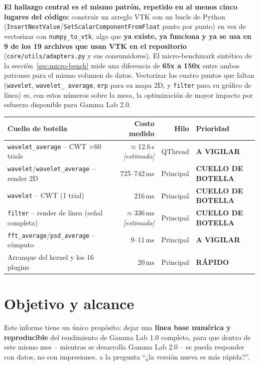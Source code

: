 \documentclass[11pt,a4paper]{article}
\newcommand{\okmark}{\textcolor{ok}{\textbf{RÁPIDO}}}
\newcommand{\warnmark}{\textcolor{advertencia}{\textbf{A VIGILAR}}}
\newcommand{\critmark}{\textcolor{critico}{\textbf{CUELLO DE BOTELLA}}}
\newcommand{\estmark}{\textcolor{gris}{\textit{[estimado]}}}
\begin{document}
\textbf{El hallazgo central es el mismo patrón, repetido en al menos cinco lugares del código:} construir un
arreglo VTK con un bucle de Python (\texttt{InsertNextValue}/\texttt{SetScalarComponentFromFloat} punto por
punto) en vez de vectorizar con \texttt{numpy\_\allowbreak to\_\allowbreak vtk}, algo que \textbf{ya existe,
ya funciona y ya se usa en 9 de los 19 archivos que usan VTK en el repositorio}
(\texttt{core/utils/adapters.py} y sus consumidores). El micro-benchmark sintético de la
sección~\ref{sec:micro-bench} mide una diferencia de \textbf{65x a 150x} entre ambos patrones para el mismo
volumen de datos. Vectorizar los cuatro puntos que faltan (\texttt{wavelet}, \texttt{wavelet\_\allowbreak
average}, \texttt{erp} para su mapa 2D, y \texttt{filter} para su gráfico de línea) es, con estos números
sobre la mesa, la optimización de mayor impacto por esfuerzo disponible para Gamma Lab 2.0.

\begin{center}
\begin{tabular}{lrrl}
\toprule
\textbf{Cuello de botella} & \textbf{Costo medido} & \textbf{Hilo} & \textbf{Prioridad} \\
\midrule
\texttt{wavelet\_\allowbreak average} -- CWT $\times$60 trials & $\approx$12.6\,s \estmark & QThread & \warnmark \\
\texttt{wavelet}/\texttt{wavelet\_\allowbreak average} -- render 2D & 725--742\,ms & Principal & \critmark \\
\texttt{wavelet} -- CWT (1 trial) & 216\,ms & Principal & \critmark \\
\texttt{filter} -- render de línea (señal completa) & $\approx$336\,ms \estmark & Principal & \critmark \\
\texttt{fft\_\allowbreak average}/\texttt{psd\_\allowbreak average} -- cómputo & 9--11\,ms & Principal & \warnmark \\
Arranque del kernel y los 16 plugins & 20\,ms & Principal & \okmark \\
\bottomrule
\end{tabular}
\end{center}

\section{Objetivo y alcance}

Este informe tiene un único propósito: dejar una \textbf{línea base numérica y reproducible} del rendimiento
de Gamma Lab 1.0 completo, para que dentro de este mismo mes -- mientras se desarrolla Gamma Lab 2.0 -- se
pueda responder con datos, no con impresiones, a la pregunta ``¿la versión nueva es más rápida?''.
\end{document}
